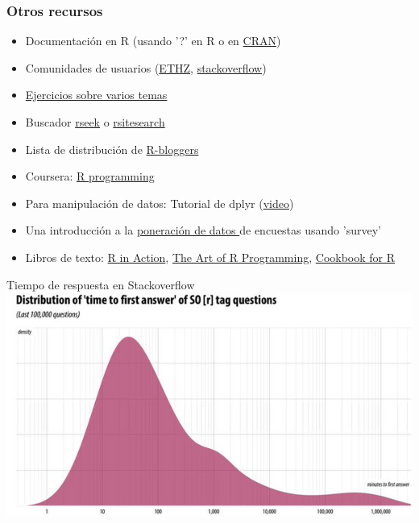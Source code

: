 \documentclass{beamer}
\begin{document}
\begin{frame}
 \frametitle{Otros recursos	}
      \begin{itemize}
      \item Documentaci\'on en R (usando '?' en R o en \textcolor{blue}{\href{https://cran.r-project.org/}{CRAN}})
      \item Comunidades de usuarios (\textcolor{blue}{\hyperlink{https://stat.ethz.ch/mailman/listinfo/r-help}{ETHZ}}, \textcolor{blue}{\href{http://stackoverflow.com/}{stackoverflow}}) 
	  \item \textcolor{blue}{\href{http://r-exercises.com/start-here-to-learn-r/}{Ejercicios sobre varios temas}}
      \item Buscador \textcolor{blue}{\href{http://rseek.org/}{rseek}}  o \textcolor{blue}{\href{http://finzi.psych.upenn.edu/search.html}{rsitesearch}}
 	    \item Lista de distribuci\'on de \textcolor{blue}{\href{http://www.r-bloggers.com/}{R-bloggers}}
	    \item Coursera: \textcolor{blue}{\href{https://www.coursera.org/learn/r-programming}{R programming}}
	    \item Para manipulaci\'on de datos: Tutorial de dplyr (\textcolor{blue}{\href{http://www.r-bloggers.com/hadley-wickhams-dplyr-tutorial-at-user-2014-part-1/}{video}})
	    \item Una introducci\'on a la \textcolor{blue}{\href{http://tophcito.blogspot.com/2014/04/social-science-goes-r-weighted-survey.html}{poneraci\'on de datos }} de encuestas usando 'survey' 
	    \item Libros de texto: \textcolor{blue}{\href{http://www.statmethods.net/}{R in Action}}, \textcolor{blue}{\href{http://heather.cs.ucdavis.edu/~matloff/132/NSPpart.pdf}{The Art of R Programming}}, \textcolor{blue}{\href{http://www.cookbook-r.com/}{Cookbook for R}}
  	   \end{itemize}
\end{frame}

\begin{frame}{Tiempo de respuesta en Stackoverflow}
      \includegraphics[scale=0.5]{answer}
  \end{frame}
\end{document}
